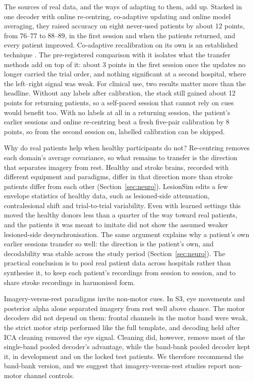 The sources of real data, and the ways of adapting to them, add up. Stacked in one decoder with online re-centring, co-adaptive updating and online model averaging, they raised accuracy on eight never-used patients by about 12 points, from 76--77\pct{} to 88--89\pct{}, in the first session and when the patients returned, and every patient improved. Co-adaptive recalibration on its own is an established technique \citep{vidaurre2011}. The pre-registered comparison with it isolates what the transfer methods add on top of it: about 3 points in the first session once the updates no longer carried the trial order, and nothing significant at a second hospital, where the left--right signal was weak. For clinical use, two results matter more than the headline. Without any labels after calibration, the stack still gained about 12 points for returning patients, so a self-paced session that cannot rely on cues would benefit too. With no labels at all in a returning session, the patient's earlier sessions and online re-centring beat a fresh five-pair calibration by 8 points, so from the second session on, labelled calibration can be skipped.

Why do real patients help when healthy participants do not? Re-centring removes each domain's average covariance, so what remains to transfer is the direction that separates imagery from rest. Healthy and stroke brains, recorded with different equipment and paradigms, differ in that direction more than stroke patients differ from each other (Section~\ref{sec:neuro}). LesionSim edits a few envelope statistics of healthy data, such as lesioned-side attenuation, contralesional shift and trial-to-trial variability. Even with learned settings this moved the healthy donors less than a quarter of the way toward real patients, and the patients it was meant to imitate did not show the assumed weaker lesioned-side desynchronisation. The same argument explains why a patient's own earlier sessions transfer so well: the direction is the patient's own, and decodability was stable across the study period (Section~\ref{sec:neuro}). The practical conclusion is to pool real patient data across hospitals rather than synthesise it, to keep each patient's recordings from session to session, and to share stroke recordings in harmonised form.

Imagery-versus-rest paradigms invite non-motor cues. In S3, eye movements and posterior alpha alone separated imagery from rest well above chance. The motor decoders did not depend on them: frontal channels in the motor band were weak, the strict motor strip performed like the full template, and decoding held after ICA cleaning removed the eye signal. Cleaning did, however, remove most of the single-band pooled decoder's advantage, while the band-bank pooled decoder kept it, in development and on the locked test patients. We therefore recommend the band-bank version, and we suggest that imagery-versus-rest studies report non-motor channel controls.

